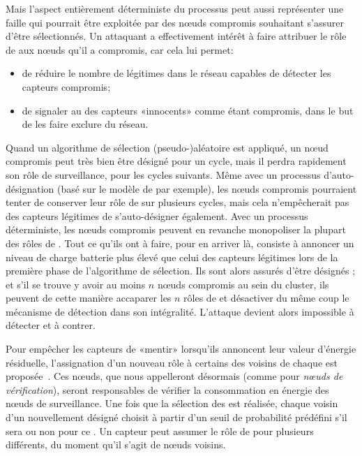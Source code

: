 Mais l'aspect entièrement déterministe du processus peut aussi représenter une faille qui pourrait être exploitée par des nœuds compromis souhaitant s'assurer d'être sélectionnés.
Un attaquant a effectivement intérêt à faire attribuer le rôle de \cn aux nœuds qu'il a compromis, car cela lui permet:
\begin{itemize}
    \item de réduire le nombre de \cns légitimes dans le réseau capables de détecter les capteurs compromis;
    \item de signaler au \ch des capteurs «innocents» comme étant compromis, dans le but de les faire exclure du réseau.
\end{itemize}
Quand un algorithme de sélection (pseudo-)aléatoire est appliqué, un nœud compromis peut très bien être désigné pour un cycle, mais il perdra rapidement son rôle de surveillance, pour les cycles suivants.
Même avec un processus d'auto-désignation (basé sur le modèle de \leach par exemple), les nœuds compromis pourraient tenter de conserver leur rôle de \cn sur plusieurs cycles, mais cela n'empêcherait pas des capteurs légitimes de s'auto-désigner également.
Avec un processus déterministe, les nœuds compromis peuvent en revanche monopoliser la plupart des rôles de \cns.
Tout ce qu'ils ont à faire, pour en arriver là, consiste à annoncer un niveau de charge batterie plus élevé que celui des capteurs légitimes lors de la première phase de l'algorithme de sélection.
Ils sont alors assurés d'être désignés \cns; et s'il se trouve y avoir au moins $n$ nœuds compromis au sein du cluster, ils peuvent de cette manière accaparer les $n$ rôles de \cn et désactiver du même coup le mécanisme de détection dans son intégralité.
L'attaque devient alors impossible à détecter et à contrer.

Pour empêcher les capteurs de «mentir» lorsqu'ils annoncent leur valeur d'énergie résiduelle, l'assignation d'un nouveau rôle à certains des voisins de chaque \cn est proposée~\cite{MMB14,MM15}.
Ces nœuds, que nous appelleront désormais \vns (comme pour \textit{nœuds de vérification}), seront responsables de vérifier la consommation en énergie des nœuds de surveillance.
Une fois que la sélection des \cns est réalisée, chaque voisin d'un \cn nouvellement désigné choisit à partir d'un seuil de probabilité prédéfini s'il sera ou non \vn pour ce \cn.
Un capteur peut assumer le rôle de \vn pour plusieurs \cn différents, du moment qu'il s'agit de nœuds voisins.

